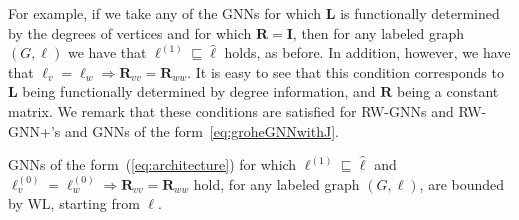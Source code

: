 For example, if we take any of the GNNs for which $\mathbf{L}$ is functionally determined by
the degrees of vertices and for which $\mathbf{R}=\mathbf{I}$, then for any labeled graph $(G,\pmb{\ell})$ we have that $\pmb{\ell}^{(1)}\sqsubseteq \hat{\pmb{\ell}}$ holds, as before. In addition, however, we have that $\pmb{\ell}_v=\pmb{\ell}_w\Rightarrow \mathbf{R}_{vv}=\mathbf{R}_{ww}$. It is easy to see that this condition  corresponds to 
$\mathbf{L}$ being functionally determined by degree information, and $\mathbf{R}$ being a constant matrix. We remark that these conditions are satisfied for RW-GNNs and RW-GNN+'s
and GNNs of the form~\ref{eq:groheGNNwithJ}. 

\begin{corollary}\label{cor:weak}
	GNNs of the form~(\ref{eq:architecture}) for which 
	$\pmb{\ell}^{(1)}\sqsubseteq\hat{\pmb{\ell}}$  and
	$\pmb{\ell}^{(0)}_v=\pmb{\ell}^{(0)}_w\Rightarrow \mathbf{R}_{vv}=\mathbf{R}_{ww}$ hold,
 for any labeled graph $(G,\pmb{\ell})$, are bounded by WL, starting from $\pmb{\ell}$.
\end{corollary}

